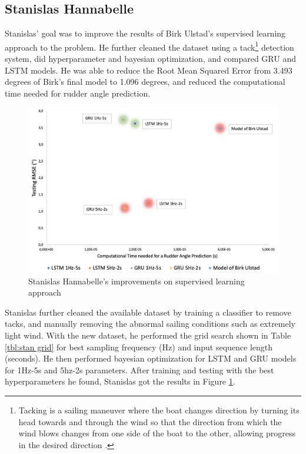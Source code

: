 \documentclass[12pt,twoside]{report}
\begin{document}
\subsection{Stanislas Hannabelle} \label{sec:Stan}
Stanislas' \cite{stan} goal was to improve the results of Birk Ulstad's supervised learning approach to the problem. He further cleaned the dataset using a tack\footnote{Tacking is a sailing maneuver where the boat changes direction by turning its head towards and through the wind so that the direction from which the wind blows changes from one side of the boat to the other, allowing progress in the desired direction \cite{wiki:tack}.} detection system, did hyperparameter and bayesian optimization, and compared GRU and LSTM models. He was able to reduce the Root Mean Squared Error from 3.493 degrees of Birk's final model to 1.096 degrees, and reduced the computational time needed for rudder angle prediction.

\begin{figure}[h]
\centering
\includegraphics[width = 0.95\hsize]{figures/stan results.png}
\caption{Stanislas Hannabelle's improvements on supervised learning approach \cite{stan}}
\label{fig:stan results}
\end{figure}

Stanislas further cleaned the available dataset by training a classifier to remove tacks, and manually removing the abnormal sailing conditions such as extremely light wind. With the new dataset, he performed the grid search shown in Table \ref{tbl:stan grid} for best sampling frequency (Hz) and input sequence length (seconds). He then performed bayesian optimization for LSTM and GRU models for 1Hz-5s and 5hz-2s parameters. After training and testing with the best hyperparameters he found, Stanislas got the results in Figure \ref{fig:stan results}.
\end{document}
